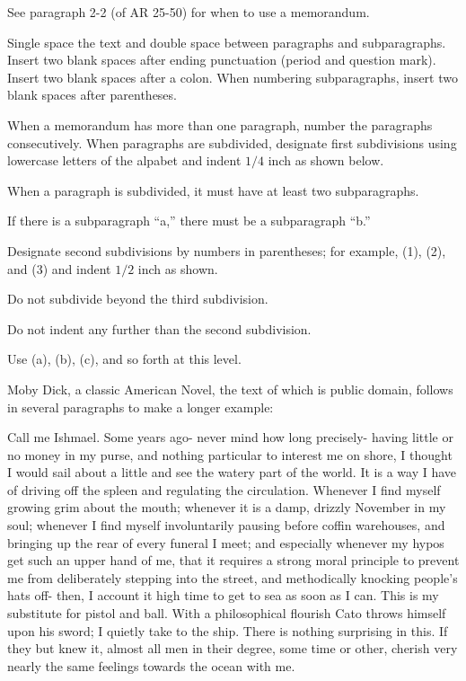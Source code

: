 \documentclass{armymemo}
\begin{document}
\AMsethead

\Ni See paragraph 2-2 (of AR 25-50) for when to use a memorandum.

\Ni Single space the text and double space between paragraphs and
subparagraphs. Insert two blank spaces after ending punctuation (period and
question mark). %
Insert two blank spaces after a colon. When numbering subparagraphs, insert two
blank spaces after parentheses.

\Ni When a memorandum has more than one paragraph, number the paragraphs
consecutively. When paragraphs are subdivided, designate first subdivisions
using lowercase letters of the alpabet and indent $1/4$ inch as shown below.

\Nii When a paragraph is subdivided, it must have at least two subparagraphs.

\Nii If there is a subparagraph ``a,'' there must be a subparagraph ``b.''

\Niii Designate second subdivisions by numbers in parentheses; for example, (1),
(2), and (3) and indent $1/2$ inch as shown.

\Niii Do not subdivide beyond the third subdivision.

\Niiii Do not indent any further than the second subdivision.

\Niiii Use (a), (b), (c), and so forth at this level.

\Ni Moby Dick, a classic American Novel, the text of which is public domain,
follows in several paragraphs to make a longer example:

\Nii Call me Ishmael. Some years ago- never mind how long precisely- having little or
no money in my purse, and nothing particular to interest me on shore, I thought
I would sail about a little and see the watery part of the world. It is a way I
have of driving off the spleen and regulating the circulation. Whenever I find
myself growing grim about the mouth; whenever it is a damp, drizzly November in
my soul; whenever I find myself involuntarily pausing before coffin warehouses,
and bringing up the rear of every funeral I meet; and especially whenever my
hypos get such an upper hand of me, that it requires a strong moral principle to
prevent me from deliberately stepping into the street, and methodically knocking
people's hats off- then, I account it high time to get to sea as soon as I can.
This is my substitute for pistol and ball. With a philosophical flourish Cato
throws himself upon his sword; I quietly take to the ship. There is nothing
surprising in this. If they but knew it, almost all men in their degree, some
time or other, cherish very nearly the same feelings towards the ocean with me.
\end{document}

